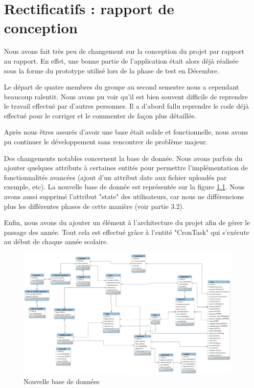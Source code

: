 \chapter{Rectificatifs : rapport de conception}

Nous avons fait très peu de changement sur la conception du projet par rapport au rapport. En effet, une bonne partie de l'application était alors déjà réalisée sous la forme du prototype utilisé lors de la phase de test en Décembre.

Le départ de quatre membres du groupe au second semestre nous a cependant beaucoup ralentit. Nous avons pu voir qu'il est bien souvent difficile de reprendre le travail effectué par d'autres personnes. Il a d'abord fallu reprendre le code déjà effectué pour le corriger et le commenter de façon plus détaillée.

Après nous êtres assurés d'avoir une base était solide et fonctionnelle, nous avons pu continuer le développement sans rencontrer de problème majeur. 

Des changements notables concernent la base de donnée. Nous avons parfois du ajouter quelques attributs à certaines entités pour permettre l'implémentation de fonctionnalités avancées (ajout d'un attribut date aux fichier uploadés par exemple, etc). La nouvelle base de donnée est représentée sur la figure \ref{bdd}. Nous avons aussi supprimé l'attribut "state" des utilisateurs, car nous ne différencions plus les différentes phases de cette manière (voir partie 3.2).

Enfin, nous avons du ajouter un élément à l'architecture du projet afin de gérer le passage des année. Tout cela est effectué grâce à l'entité "CronTask" qui s'exécute au début de chaque année scolaire.


\begin{figure}
	\centering
	\includegraphics[angle=90,scale=0.35]{images/screen_bdd.png}
	\caption{Nouvelle base de données}
	\label{bdd}
\end{figure}

